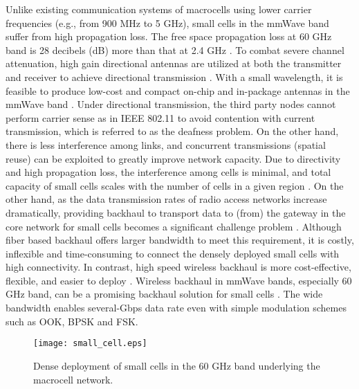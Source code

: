 \documentclass[journal]{IEEEtran}
\begin{document}
Unlike existing communication systems of macrocells using lower carrier frequencies (e.g., from 900
MHz to 5 GHz), small cells in the mmWave band suffer from high propagation loss. The free space
propagation loss at 60 GHz band is 28 decibels (dB) more than that at 2.4 GHz \cite{singh_outdoor}.
To combat severe channel attenuation, high gain directional antennas are utilized at both the
transmitter and receiver to achieve directional transmission \cite{beam_training, Beamtraining2, MRDMAC}. With a small wavelength, it is feasible to produce low-cost and compact on-chip and in-package antennas in the mmWave band \cite{CMOS3, mao}. Under directional transmission, the third party nodes cannot perform carrier sense as in IEEE 802.11 to avoid contention with current transmission, which is referred to as the deafness problem. On the other hand, there is less interference among links, and concurrent transmissions (spatial reuse)
can be exploited to greatly improve network capacity. Due to directivity and high propagation loss,
the interference among cells is minimal, and total capacity of small cells scales with the number
of cells in a given region \cite{Pico_60GHz}. On the other hand, as the data transmission rates of
radio access networks increase dramatically, providing backhaul to transport data to (from) the
gateway in the core network for small cells becomes a significant challenge
problem \cite{60GHz-backhaul-2}. Although fiber based backhaul offers larger bandwidth to meet this
requirement, it is costly, inflexible and time-consuming to connect the densely deployed small
cells with high connectivity. In contrast, high speed wireless backhaul is more cost-effective,
flexible, and easier to deploy \cite{60GHz-backhaul-2, Narlikar, 60GHz-backhaul-1,
60GHz-backhaul-4}. Wireless backhaul in mmWave bands, especially 60 GHz band, can be a promising
backhaul solution for small cells \cite{60GHz-backhaul-1}. The wide bandwidth enables several-Gbps
data rate even with simple modulation schemes such as OOK, BPSK and FSK.







\begin{figure} [htbp] \begin{center}
\texttt{[image: small\_cell.eps]}
\end{center}
\caption{Dense deployment of small cells in the 60 GHz band underlying the macrocell network.}
\label{small cell}
\end{figure}
\end{document}
